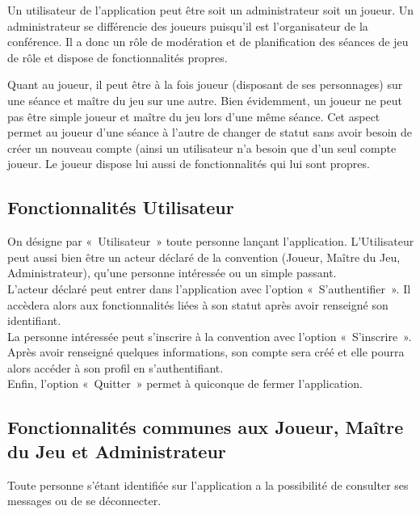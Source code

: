 \documentclass[11pt]{article}
\begin{document}
Un utilisateur de l'application peut être soit un administrateur soit un joueur. Un administrateur se différencie des joueurs puisqu'il est l'organisateur de la conférence. Il a donc un rôle de modération et de planification des séances de jeu de rôle et dispose de fonctionnalités propres.

Quant au joueur, il peut être à la fois joueur (disposant de ses personnages) sur une séance et maître du jeu sur une autre. Bien évidemment, un joueur ne peut pas être simple joueur et maître du jeu lors d’une même séance. Cet aspect permet au joueur d’une séance à l’autre de changer de statut sans avoir besoin de créer un nouveau compte (ainsi un utilisateur n’a besoin que d’un seul compte joueur. Le joueur dispose lui aussi de fonctionnalités qui lui sont propres.



\subsection{Fonctionnalités Utilisateur}

On désigne par «~Utilisateur~» toute personne lançant l'application. L'Utilisateur peut aussi bien être un acteur déclaré de la convention (Joueur, Maître du Jeu, Administrateur), qu'une personne intéressée ou un simple passant.\\

L'acteur déclaré peut entrer dans l'application avec l'option «~S'authentifier~». Il accèdera alors aux fonctionnalités liées à son statut après avoir renseigné son identifiant.\\

La personne intéressée peut s'inscrire à la convention avec l'option «~S'inscrire~». Après avoir renseigné quelques informations, son compte sera créé et elle pourra alors accéder à son profil en s'authentifiant.\\

Enfin, l'option «~Quitter~» permet à quiconque de fermer l'application.\\



\subsection{Fonctionnalités communes aux Joueur, Maître du Jeu et Administrateur}

Toute personne s'étant identifiée sur l'application a la possibilité de consulter ses messages ou de se déconnecter.\\
\end{document}

